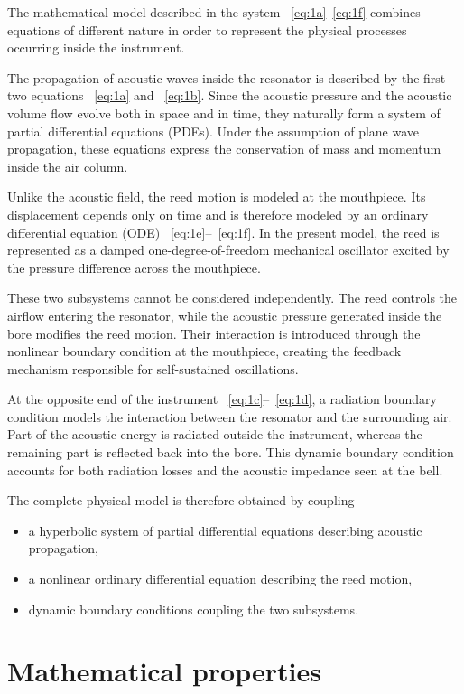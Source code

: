 \documentclass[11pt,a4paper]{report}
\theoremstyle{plain}
\theoremstyle{definition}
\begin{document}
The mathematical model described in the system ~\ref{eq:1a}--\ref{eq:1f} combines equations 
of different nature in order to represent the physical processes occurring inside the instrument.

The propagation of acoustic waves inside the resonator is described by the first two equations ~\ref{eq:1a} and ~\ref{eq:1b}. 
Since the acoustic pressure and the acoustic volume flow evolve both in space and in time, they naturally form a system of partial 
differential equations (PDEs). Under the assumption of plane wave propagation, these equations express the conservation of mass and 
momentum inside the air column.

Unlike the acoustic field, the reed motion is modeled at the mouthpiece. Its displacement depends only on time and is therefore 
modeled by an ordinary differential equation (ODE) ~\ref{eq:1e}--~\ref{eq:1f}. In the present model, the reed is represented as a damped one-degree-of-freedom 
mechanical oscillator excited by the pressure difference across the mouthpiece.

These two subsystems cannot be considered independently. The reed controls the airflow entering the resonator, while the acoustic 
pressure generated inside the bore modifies the reed motion. Their interaction is introduced through the nonlinear boundary condition 
at the mouthpiece, creating the feedback mechanism responsible for self-sustained oscillations.

At the opposite end of the instrument ~\ref{eq:1c}--~\ref{eq:1d}, a radiation boundary condition models the interaction between the resonator and the surrounding air. 
Part of the acoustic energy is radiated outside the instrument, whereas the remaining part is reflected back into the bore. 
This dynamic boundary condition accounts for both radiation losses and the acoustic impedance seen at the bell.

The complete physical model is therefore obtained by coupling

\begin{itemize}
    \item a hyperbolic system of partial differential equations describing acoustic propagation,
    \item a nonlinear ordinary differential equation describing the reed motion,
    \item dynamic boundary conditions coupling the two subsystems.
\end{itemize}

\section{Mathematical properties}
\end{document}
